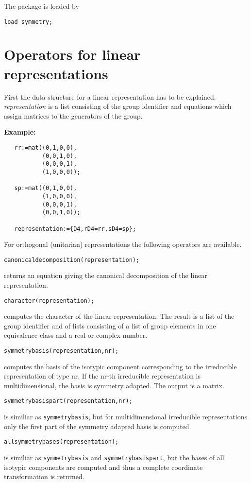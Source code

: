 The package is loaded by

{\tt load symmetry;}

\section{Operators for linear representations}

First the data structure for a linear representation has to be explained.
{\em representation} is a list consisting of the group identifier and
equations which assign matrices to the generators of the group.

{\bf Example:}
\begin{verbatim}
   rr:=mat((0,1,0,0),
           (0,0,1,0),
           (0,0,0,1),
           (1,0,0,0));

   sp:=mat((0,1,0,0),
           (1,0,0,0),
           (0,0,0,1),
           (0,0,1,0));

   representation:={D4,rD4=rr,sD4=sp};
\end{verbatim}

For orthogonal (unitarian) representations the following operators
are available.

{\tt canonicaldecomposition(representation);} 

returns an equation giving the canonical decomposition of the linear
representation.

{\tt character(representation);}

computes the character of the linear representation. The result is a list
of the group identifier and of lists consisting of a 
list of group elements in one equivalence class and a real or complex number.

{\tt symmetrybasis(representation,nr);}

computes the basis of the isotypic component corresponding to the irreducible
representation of type nr. If the nr-th irreducible representation is
multidimensional, the basis is symmetry adapted. The output is a matrix.
 
{\tt symmetrybasispart(representation,nr);}

is similiar as {\tt symmetrybasis}, but for multidimensional 
irreducible representations only the first part of the 
symmetry adapted basis is computed.

{\tt allsymmetrybases(representation);}

is similiar as {\tt symmetrybasis} and {\tt symmetrybasispart}, 
but the bases of all
isotypic components are computed and thus a 
complete coordinate transformation is returned.

